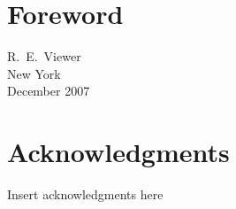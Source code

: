 \newpage\null\thispagestyle{empty}\newpage

\brieftableofcontents

\tableofcontents


\chapter*[Foreword]{Foreword}
\turnoffbigpara


\bigskip

\begin{raggedleft}
R.~E.~Viewer\\
New York\\
December 2007\\
\end{raggedleft}

\chapter*{Acknowledgments}
\turnoffbigpara

Insert acknowledgments here
